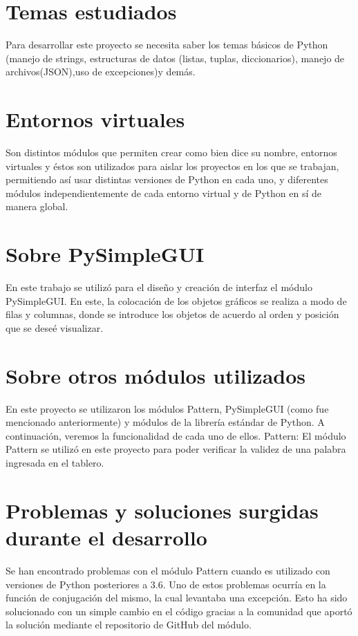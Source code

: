 \documentclass[12pt]{article}
\begin{document}
\section{Temas estudiados}
Para desarrollar este proyecto se necesita saber los temas básicos de Python (manejo de strings, estructuras de datos (listas, tuplas, diccionarios), manejo de archivos(JSON),uso de excepciones)y demás.

\section{Entornos virtuales}
Son distintos módulos que permiten crear como bien dice su nombre, entornos virtuales y éstos son utilizados para aislar los proyectos en los que se trabajan, permitiendo así usar distintas versiones de Python en cada uno, y diferentes módulos independientemente de cada entorno virtual y de Python en sí de manera global.

\section{Sobre PySimpleGUI}
En este trabajo se utilizó para el diseño y creación de interfaz el módulo PySimpleGUI.
En este, la colocación de los objetos gráficos se realiza a modo de filas y columnas, donde se introduce los objetos de acuerdo al orden y posición que se deseé visualizar.

\section{Sobre otros módulos utilizados}
En este proyecto se utilizaron los módulos Pattern, PySimpleGUI (como fue mencionado anteriormente) y módulos de la librería estándar de Python. A continuación, veremos la funcionalidad de cada uno de ellos.
Pattern:
El módulo Pattern se utilizó en este proyecto para poder verificar la validez de una palabra ingresada en el tablero.

\section{Problemas y soluciones surgidas durante el desarrollo}
Se han encontrado problemas con el módulo Pattern cuando es utilizado con versiones de Python posteriores a 3.6. Uno de estos problemas ocurría en la función de conjugación del mismo, la cual levantaba una excepción. Esto ha sido solucionado con un simple cambio en el código gracias a la comunidad que aportó la solución mediante el repositorio de GitHub del módulo.
\end{document}
